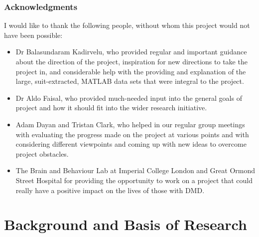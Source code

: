 \documentclass[12pt,twoside]{report}
\begin{document}
\clearpage
\section*{Acknowledgments}

\quad I would like to thank the following people, without whom this project would not have been possible:

\begin{itemize}
	\item Dr Balasundaram Kadirvelu, who provided regular and important guidance about the direction of the project, inspiration for new directions to take the project in, and considerable help with the providing and explanation of the large, suit-extracted, MATLAB data sets that were integral to the project.
	\item Dr Aldo Faisal, who provided much-needed input into the general goals of project and how it should fit into the wider research initiative.
	\item Adam Dayan and Tristan Clark, who helped in our regular group meetings with evaluating the progress made on the project at various points and with considering different viewpoints and coming up with new ideas to overcome project obstacles.
	\item The Brain and Behaviour Lab at Imperial College London and Great Ormond Street Hospital for providing the opportunity to work on a project that could really have a positive impact on the lives of those with DMD.
\end{itemize}


\tableofcontents 


\clearpage{\pagestyle{empty}\cleardoublepage}
\setcounter{page}{1}
\fancyhead[LE,RO]{\slshape \rightmark}
\fancyhead[LO,RE]{\slshape \leftmark}



















\part{Background and Basis of Research}
\end{document}
